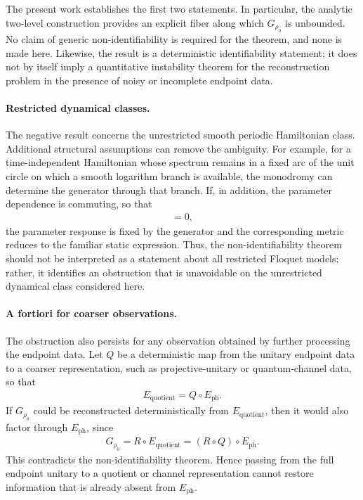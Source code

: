 \documentclass[twocolumn,prl,aps,floatfix]{revtex4-2}
\begin{document}
The present work establishes the first two statements. In particular, the analytic two-level construction provides an explicit fiber along which $G_{\rho_0}$ is unbounded. No claim of generic non-identifiability is required for the theorem, and none is made here. Likewise, the result is a deterministic identifiability statement; it does not by itself imply a quantitative instability theorem for the reconstruction problem in the presence of noisy or incomplete endpoint data.

\paragraph{Restricted dynamical classes.}
The negative result concerns the unrestricted smooth periodic Hamiltonian class. Additional structural assumptions can remove the ambiguity. For example, for a time-independent Hamiltonian whose spectrum remains in a fixed arc of the unit circle on which a smooth logarithm branch is available, the monodromy can determine the generator through that branch. If, in addition, the parameter dependence is commuting, so that
\begin{align}
[H_\theta,\partial_\theta H_\theta]=0,
\end{align}
the parameter response is fixed by the generator and the corresponding metric reduces to the familiar static expression. Thus, the non-identifiability theorem should not be interpreted as a statement about all restricted Floquet models; rather, it identifies an obstruction that is unavoidable on the unrestricted dynamical class considered here.

\paragraph{A fortiori for coarser observations.}
The obstruction also persists for any observation obtained by further processing the endpoint data. Let $Q$ be a deterministic map from the unitary endpoint data to a coarser representation, such as projective-unitary or quantum-channel data, so that
\begin{align}
E_{\mathrm{quotient}}=Q\circ E_{\mathrm{ph}}.
\end{align}
If $G_{\rho_0}$ could be reconstructed deterministically from $E_{\mathrm{quotient}}$, then it would also factor through $E_{\mathrm{ph}}$, since
\begin{align}
G_{\rho_0}
=
R\circ E_{\mathrm{quotient}}
=
(R\circ Q)\circ E_{\mathrm{ph}}.
\end{align}
This contradicts the non-identifiability theorem. Hence passing from the full endpoint unitary to a quotient or channel representation cannot restore information that is already absent from $E_{\mathrm{ph}}$.
\end{document}
